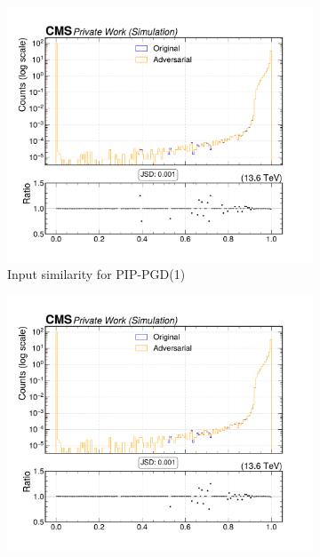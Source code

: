 \begin{figure}[htbp]
  \centering
  \begin{subfigure}[t]{0.32\textwidth}
    \includegraphics[width=\linewidth]{media/output/features/compare/combined_it_1/cmp_cpf_arr_Cpfcan_BtagPf_trackPParRatio.pdf}
    \caption*{Input similarity for PIP-PGD(1)}
  \end{subfigure}\hfill
  \begin{subfigure}[t]{0.32\textwidth}
    \includegraphics[width=\linewidth]{media/output/features/compare/combined_it_2/cmp_cpf_arr_Cpfcan_BtagPf_trackPParRatio.pdf}

\end{subfigure}
\end{figure}
